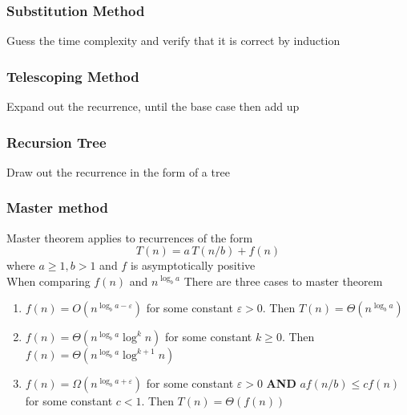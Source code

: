 \documentclass{article}
\begin{document}
\begin{multicols*}{4}
\subsubsection{Substitution Method}
Guess the time complexity and verify that it is correct by induction
\subsubsection{Telescoping Method}
Expand out the recurrence, until the base case then add up
\subsubsection{Recursion Tree}
Draw out the recurrence in the form of a tree
\subsubsection{Master method}
Master theorem applies to recurrences of the form
$$T(n)=a\,T(n/b)+f(n)$$
where $a\geq1, b>1$ and $f$ is asymptotically positive\\
When comparing $f(n)$ and $n^{\log_b a}$
There are three cases to master theorem
\begin{enumerate}
\item $f(n)=O(n^{\log_b a-\varepsilon})$ for some constant $\varepsilon>0$. Then $T(n)=\Theta(n^{\log_b a})$
\item $f(n)=\Theta(n^{\log_b a}\log^k n)$ for some constant $k\geq 0$. Then $f(n)=\Theta(n^{\log_b a}\log^{k+1} n)$
\item $f(n)=\Omega(n^{\log_b a+\varepsilon})$ for some constant $\varepsilon>0$ \textbf{AND} $af(n/b)\leq cf(n)$ for some constant $c<1$. Then $T(n)=\Theta(f(n))$
\end{enumerate}


\end{multicols*}
\end{document}
